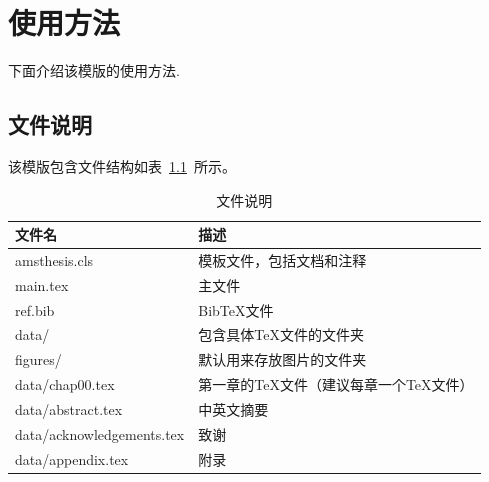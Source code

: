 
\chapter{使用方法}
下面介绍该模版的使用方法.

\section{文件说明}


该模版包含文件结构如表~\ref{tab:file}~所示。

\begin{table}[htb]
  \centering
  \caption{文件说明}
  \begin{tabular}{ll}
    \toprule
    文件名                       & 描述                     \\
    \midrule
    amsthesis.cls   & 模板文件，包括文档和注释   \\
    main.tex                  & 主文件                    \\
    ref.bib                   & BibTeX文件               \\
    data/                     & 包含具体TeX文件的文件夹          \\
    figures/                  & 默认用来存放图片的文件夹           \\
    data/chap00.tex           & 第一章的TeX文件（建议每章一个TeX文件） \\
    data/abstract.tex         & 中英文摘要                  \\
    data/acknowledgements.tex & 致谢                     \\
    data/appendix.tex         & 附录                     \\
    \bottomrule
  \end{tabular}
  \label{tab:file}
\end{table}

